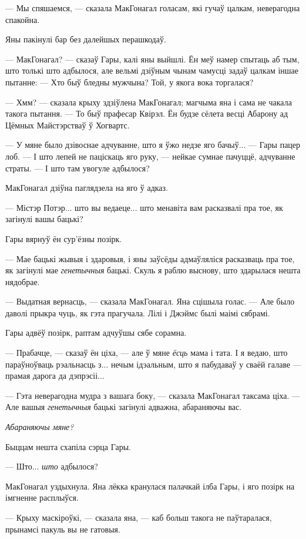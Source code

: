 --- Мы спяшаемся, --- сказала МакГонагал голасам, які гучаў цалкам, неверагодна спакойна.

Яны пакінулі бар без далейшых перашкодаў.

--- МакГонагал? --- сказаў Гары, калі яны выйшлі. Ён меў намер спытаць аб тым, што толькі што
адбылося, але вельмі дзіўным чынам чамусці задаў цалкам іншае пытанне: --- Хто быў бледны 
мужчына? Той, у якога вока торгалася?

--- Хмм? --- сказала крыху здзіўлена МакГонагал; магчыма яна і сама не чакала такога пытання. --- То 
быў прафесар Квірэл. Ён будзе сёлета весці Абарону ад Цёмных Майстэрстваў ў Хогвартс. 

--- У мяне было дзівоснае адчуванне, што я ўжо недзе яго бачыў... --- Гары пацер лоб. --- І што
лепей не паціскаць яго руку, --- нейкае сумнае пачуццё, адчуванне страты. --- І што там увогуле
адбылося?

МакГонагал дзіўна паглядзела на яго ў адказ. 

--- Містэр Потэр... што вы ведаеце... што менавіта вам расказвалі пра тое, як загінулі вашы бацькі?

Гары вярнуў ён сур'ёзны позірк.

--- Мае бацькі жывыя і здаровыя, і яны заўсёды адмаўляліся расказваць пра тое, як загінулі мае 
\emph{генетычныя} бацькі. Скуль я раблю выснову, што здарылася нешта нядобрае.

--- Выдатная вернасць, --- сказала МакГонагал. Яна сцішыла голас. --- Але было даволі прыкра чуць, як
гэта прагучала. Лілі і Джэймс былі маімі сябрамі.

Гары адвёў позірк, раптам адчуўшы сябе сорамна. 

--- Прабачце, --- сказаў ён ціха, --- але ў мяне \emph{ёсць} мама і тата. І я ведаю, што
параўноўваць рэальнасць з... нечым ідэальным, што я пабудаваў у сваёй галаве --- прамая дарога да
дэпрэсіі...

--- Гэта неверагодна мудра з вашага боку, --- сказала МакГонагал таксама ціха. --- Але вашыя
\emph{генетычныя} бацькі загінулі адважна, абараняючы вас.


\emph{Абараняючы мяне?}

Быццам нешта схапіла сэрца Гары.

--- Што... \emph{што} адбылося?

МакГонагал уздыхнула. Яна лёкка кранулася палачкай ілба Гары, і яго позірк на імгненне расплыўся. 

--- Крыху маскіроўкі, --- сказала яна, --- каб больш такога не паўтаралася, прынамсі 
пакуль вы не гатовыя.

